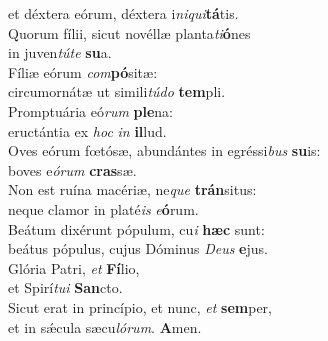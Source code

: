 \evenverse et déxtera eórum, déxtera i\textit{ni}\textit{qui}\textbf{tá}tis.\\
\oddverse Quorum fílii, sicut novéllæ planta\textit{ti}\textbf{ó}nes~\*\\
\oddverse in juven\textit{tú}\textit{te} \textbf{su}a.\\
\evenverse Fíliæ eórum \textit{com}\textbf{pó}sitæ:~\*\\
\evenverse circumornátæ ut simili\textit{tú}\textit{do} \textbf{tem}pli.\\
\oddverse Promptuária eó\textit{rum} \textbf{ple}na:~\*\\
\oddverse eructántia ex \textit{hoc} \textit{in} \textbf{il}lud.\\
\evenverse Oves eórum fœtósæ, abundántes in egréssi\textit{bus} \textbf{su}is:~\*\\
\evenverse boves e\textit{ó}\textit{rum} \textbf{cras}sæ.\\
\oddverse Non est ruína macériæ, ne\textit{que} \textbf{trán}situs:~\*\\
\oddverse neque clamor in platé\textit{is} \textit{e}\textbf{ó}rum.\\
\evenverse Beátum dixérunt pópulum, cu\textit{i} \textbf{hæc} sunt:~\*\\
\evenverse beátus pópulus, cujus Dóminus \textit{De}\textit{us} \textbf{e}jus.\\
\oddverse Glória Patri, \textit{et} \textbf{Fí}lio,~\*\\
\oddverse et Spirí\textit{tu}\textit{i} \textbf{San}cto.\\
\evenverse Sicut erat in princípio, et nunc, \textit{et} \textbf{sem}per,~\*\\
\evenverse et in sǽcula sæcu\textit{ló}\textit{rum}. \textbf{A}men.\\
